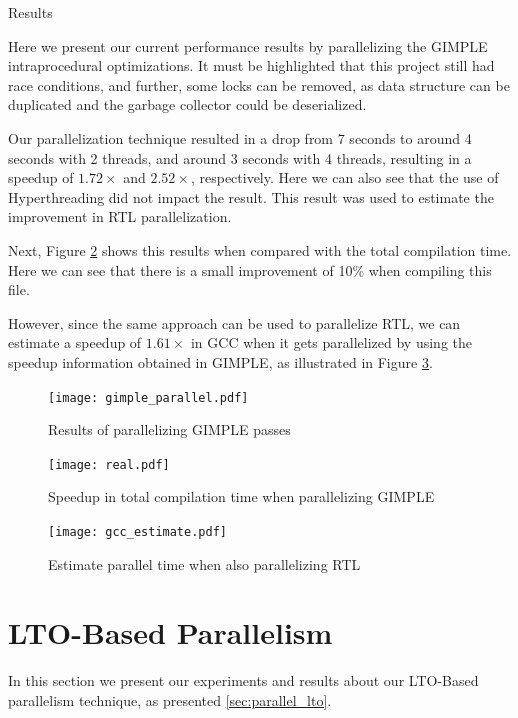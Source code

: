 \begin{subsection}{Results}\label{sec:threaded-results}

Here we present our current performance results by parallelizing the GIMPLE
intraprocedural optimizations. It must be highlighted that this project still had
race conditions, and further, some locks can be
removed, as data structure can be duplicated and the garbage collector could be
deserialized.

Our parallelization technique resulted in a drop from 7 seconds to around 4
seconds with 2 threads, and around 3 seconds with 4 threads, resulting in a
speedup of $1.72\times$ and $2.52\times$, respectively. Here we can also see
that the use of Hyperthreading did not impact the result. This result was used to
estimate the improvement in RTL parallelization.

Next, Figure \ref{fig:parallel_real} shows this results when compared with the
total compilation time. Here we can see that there is a small improvement of
10\% when compiling this file.

However, since the same approach can be used to parallelize RTL, we can
estimate a speedup of $1.61\times$ in GCC when it gets parallelized by using
the speedup information obtained in GIMPLE, as illustrated in Figure
\ref{fig:parallel_estimate}.

\begin{figure}%
 \centering
 \texttt{[image: gimple\_parallel.pdf]}
 \caption{Results of parallelizing GIMPLE passes}
 \label{fig:parallel_gimple}
\end{figure}

\begin{figure}%
 \centering
 \texttt{[image: real.pdf]}
 \caption{Speedup in total compilation time when parallelizing GIMPLE}
 \label{fig:parallel_real}
\end{figure}

\begin{figure}%
 \centering
 \texttt{[image: gcc\_estimate.pdf]}
 \caption{Estimate parallel time when also parallelizing RTL}
 \label{fig:parallel_estimate}
\end{figure}

\end{subsection}

\section{LTO-Based Parallelism}

In this section we present our experiments and results about our
LTO-Based parallelism technique, as presented \ref{sec:parallel_lto}.

